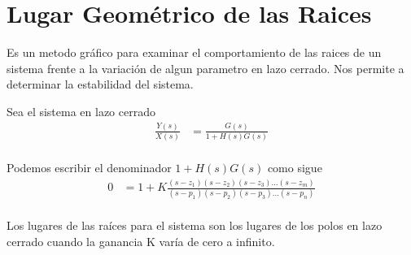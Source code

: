 \documentclass[12pt]{article}
\begin{document}
\section{Lugar Geométrico de las Raices}
Es un metodo gráfico para examinar el comportamiento de las raices de un sistema frente a la variación de algun parametro en lazo cerrado. Nos permite a determinar la estabilidad del sistema. 

Sea el sistema en lazo cerrado
\begin{equation}
    \begin{split}
        \frac{Y(s)}{X(s)}&=\frac{G(s)}{1+H(s)G(s)}\\
        \label{eq:root}
    \end{split}
\end{equation}

Podemos escribir el denominador $1+ H(s)G(s)$ como sigue
\begin{equation}
    \begin{split}
        0&=1+K\frac{(s-z_{1})(s-z_{2})(s-z_{3})...(s-z_{m})}{(s-p_{1})(s-p_{2})(s-p_{3})...(s-p_{n})}\\
        \label{eq:root1}
    \end{split}
\end{equation}

Los lugares de las raíces para el sistema son los lugares de los polos en lazo cerrado cuando la ganancia K varía de cero a infinito. \cite{ogata2003ingenieria} 
\end{document}
